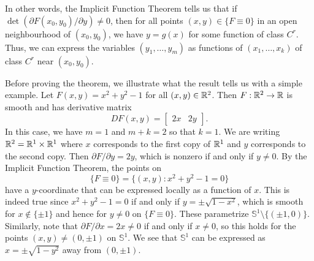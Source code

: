 In other words, the Implicit Function Theorem tells us that if 
$\det(\partial F(x_0, y_0)/\partial y) \neq 0$, then 
for all points $(x, y) \in \{F \equiv 0\}$ in an open neighbourhood of 
$(x_0, y_0)$, we have $y = g(x)$ for some function of class $C^r$. Thus, 
we can express the variables $(y_1, \dots, y_m)$ as functions of 
$(x_1, \dots, x_k)$ of class $C^r$ near $(x_0, y_0)$. 

Before proving the theorem, we illustrate what the result tells us 
with a simple example. Let $F(x, y) = x^2 + y^2 - 1$ for all $(x, y) \in \mathbb{R}^2$. 
Then $F : \mathbb{R}^2 \to \mathbb{R}$ is smooth and has derivative matrix 
\[ DF(x, y) = \begin{bmatrix}
    2x & 2y 
\end{bmatrix}. \] 
In this case, we have $m = 1$ and $m + k = 2$ so that $k = 1$. We are writing 
$\mathbb{R}^2 = \mathbb{R}^1 \times \mathbb{R}^1$ where $x$ corresponds to the first copy of $\mathbb{R}^1$ 
and $y$ corresponds to the second copy. Then $\partial F/\partial y = 2y$, 
which is nonzero if and only if $y \neq 0$. By the Implicit Function 
Theorem, the points on 
\[ \{F \equiv 0\} = \{(x, y) : x^2 + y^2 - 1 = 0\} \] 
have a $y$-coordinate that can be expressed locally as a function of $x$. 
This is indeed true since $x^2 + y^2 - 1 = 0$ if and only if 
$y = \pm\sqrt{1-x^2}$, which is smooth for $x \notin \{\pm1\}$ and hence 
for $y \neq 0$ on $\{F \equiv 0\}$. These parametrize $\mathbb{S}^1 
\setminus \{(\pm1, 0)\}$. Similarly, note that 
$\partial F/\partial x = 2x \neq 0$ if and only if $x \neq 0$, so this 
holds for the points $(x, y) \neq (0, \pm1)$ on $\mathbb{S}^1$. We see that 
$\mathbb{S}^1$ can be expressed as $x = \pm\sqrt{1-y^2}$ away from 
$(0, \pm1)$.

